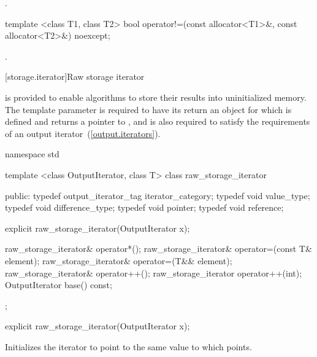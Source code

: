 \begin{itemdescr}
\pnum
\returns
{}.
\end{itemdescr}

%
%
\begin{itemdecl}
template <class T1, class T2>
  bool operator!=(const allocator<T1>&, const allocator<T2>&) noexcept;
\end{itemdecl}

\begin{itemdescr}
\pnum
\returns
{}.
\end{itemdescr}

[storage.iterator]{Raw storage iterator}

\pnum
{} is provided to enable algorithms to store their
results into uninitialized memory. The template parameter
 is required to have its  return an
object for which  is defined and returns a pointer to
, and is also required to satisfy the requirements of an output
iterator~(\ref{output.iterators}).

\begin{codeblock}
namespace std {
  template <class OutputIterator, class T>
  class raw_storage_iterator {
  public:
    typedef output_iterator_tag iterator_category;
    typedef void value_type;
    typedef void difference_type;
    typedef void pointer;
    typedef void reference;

    explicit raw_storage_iterator(OutputIterator x);

    raw_storage_iterator& operator*();
    raw_storage_iterator& operator=(const T& element);
    raw_storage_iterator& operator=(T&& element);
    raw_storage_iterator& operator++();
    raw_storage_iterator  operator++(int);
    OutputIterator base() const;
  };
}
\end{codeblock}

%
\begin{itemdecl}
explicit raw_storage_iterator(OutputIterator x);
\end{itemdecl}

\begin{itemdescr}
\pnum
\effects
Initializes the iterator to point to the same value to which  points.
\end{itemdescr}

